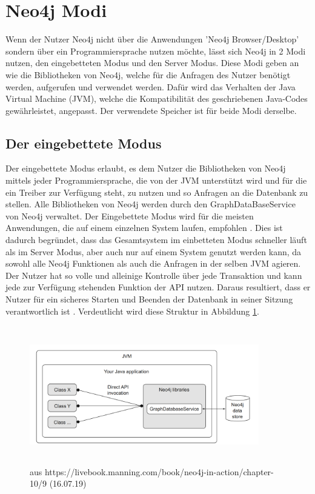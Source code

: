 \section {Neo4j Modi}
Wenn der Nutzer Neo4j nicht über die Anwendungen 'Neo4j Browser/Desktop' sondern über ein Programmiersprache nutzen möchte,  lässt sich Neo4j in 2 Modi nutzen, den eingebetteten Modus und den Server Modus. Diese Modi geben an wie die Bibliotheken von Neo4j, welche für die Anfragen des Nutzer benötigt werden, aufgerufen und verwendet werden. Dafür wird das Verhalten der Java Virtual Machine (JVM), welche die Kompatibilität des geschriebenen Java-Codes gewährleistet, angepasst. Der verwendete Speicher ist für beide Modi derselbe.

\subsection{Der eingebettete Modus}
Der eingebettete Modus erlaubt, es dem Nutzer die  Bibliotheken von Neo4j mittels jeder Programmiersprache, die von der JVM unterstützt wird und für die ein Treiber zur Verfügung steht, zu nutzen und so Anfragen an die Datenbank zu stellen. Alle Bibliotheken von Neo4j werden durch den GraphDataBaseService von Neo4j verwaltet. Der Eingebettete Modus wird für die meisten Anwendungen, die auf einem einzelnen System laufen, empfohlen \parencite{raj2015neo4j}. Dies ist dadurch begründet, dass das Gesamtsystem im einbetteten Modus schneller läuft als im Server Modus, aber auch nur auf einem System genutzt werden kann, da sowohl alle Neo4j Funktionen als auch die Anfragen in der selben JVM agieren. Der Nutzer hat so volle und alleinige Kontrolle über jede Transaktion und kann jede zur Verfügung stehenden Funktion der API nutzen. Daraus resultiert, dass er Nutzer für ein sicheres Starten und Beenden der Datenbank in seiner Sitzung verantwortlich ist \parencite{robinson2013graph}.  Verdeutlicht wird diese Struktur in Abbildung \ref{fig:Embedded}.
\begin{figure}[!htb]
	\centering	
	\includegraphics [width=10cm, height=6cm]{Figures/embedded}
	\caption[Eingebettet]{aus https://livebook.manning.com/book/neo4j-in-action/chapter-10/9 (16.07.19)}
	\label{fig:Embedded}
\end{figure}

